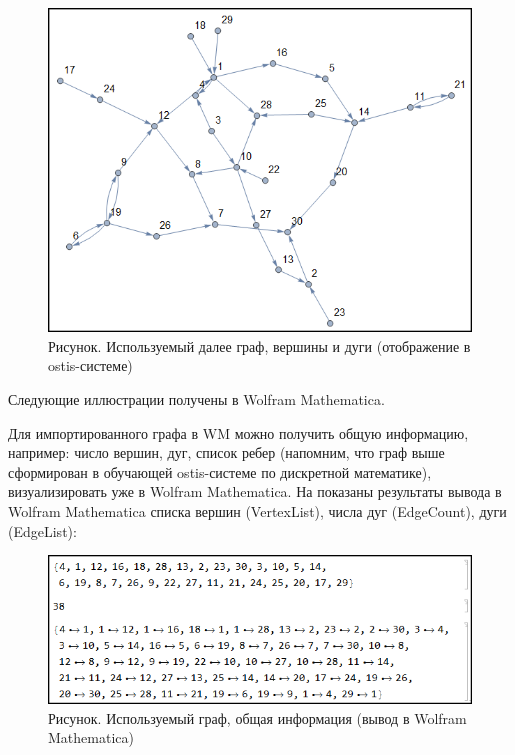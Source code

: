 \begin{figure}[H]
	\includegraphics[scale=0.9]{images/part7/chapter_integration/integr_alg31.png}
	\caption{Рисунок. Используемый далее граф, вершины и дуги (отображение в  ostis-системе)}
	\label{fig:integr_alg31}
\end{figure}

Следующие иллюстрации получены в Wolfram Mathematica. 

Для импортированного графа в WM можно получить общую информацию, например: число вершин, дуг, список ребер (напомним, что граф выше сформирован в обучающей ostis-системе по дискретной математике), визуализировать уже в Wolfram Mathematica. На \textit{}
показаны результаты вывода в Wolfram Mathematica списка вершин (VertexList), числа дуг (EdgeCount), дуги (EdgeList):
\begin{figure}[H]
	\includegraphics[scale=0.65]{images/part7/chapter_integration/integr_alg31d.png}
	\caption{Рисунок. Используемый граф, общая информация (вывод в Wolfram Mathematica)}
	\label{fig:integr_alg31d}
\end{figure}

